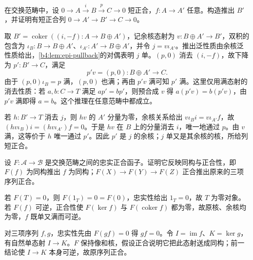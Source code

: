 \begin{exercise}\label{b4:ex:04-pushout-extension}
	在交换范畴中，设 \(0\to A\xrightarrow iB\xrightarrow pC\to0\) 短正合，\(f:A\to A'\) 任意。构造推出 \(B'\)，并证明有短正合列 \(0\to A'\to B'\to C\to0\)。
\end{exercise}
\begin{solution}
	取 \(B'=\operatorname{coker}((i,-f):A\to B\oplus A')\)，记余核态射为 \(v:B\oplus A'\to B'\)，双积的包含为 \(\iota_B:B\to B\oplus A'\)、\(\iota_{A'}:A'\to B\oplus A'\)，并令 \(j=v\iota_{A'}\)。推出泛性质由余核泛性质给出，\cref{b4:lem:epi-pullback}的对偶表明 \(j\) 单。\((p,0)\) 消去 \((i,-f)\)，故下降为 \(p':B'\to C\)，满足
	\[
		p'v=(p,0):B\oplus A'\longrightarrow C.
	\]
	由于 \((p,0)\iota_B=p\) 满，\((p,0)\) 也满；再由 \(p'v\) 满可知 \(p'\) 满。这里仅用满态射的消去性质：若 \(a,b:C\to T\) 满足 \(ap'=bp'\)，则预合成 \(v\) 得 \(a(p'v)=b(p'v)\)，由 \(p'v\) 满即得 \(a=b\)。这个推理在任意范畴中都成立。

	若 \(h:B'\to T\) 消去 \(j\)，则 \(hv\) 的 \(A'\) 分量为零，余核关系给出 \(v\iota_Bi=v\iota_{A'}f\)，故 \((hv\iota_B)i=(hv\iota_{A'})f=0\)。于是 \(hv\) 在 \(B\) 上的分量消去 \(i\)，唯一地通过 \(p\)。由 \(v\) 满，这等价于 \(h\) 唯一通过 \(p'\)。因此 \(p'\) 是 \(j\) 的余核；\(j\) 单又是其余核的核，所给列短正合。
\end{solution}

\begin{exercise}\label{b4:ex:04-faithful-exact-reflects}
	设 \(F:\mathcal A\to\mathcal B\) 是交换范畴之间的忠实正合函子。证明它反映同构与正合性，即 \(F(f)\) 为同构推出 \(f\) 为同构；\(F(X)\to F(Y)\to F(Z)\) 正合推出原来的三项序列正合。
\end{exercise}
\begin{solution}
	若 \(F(T)=0\)，则 \(F(1_T)=0=F(0)\)，忠实性给出 \(1_T=0\)，故 \(T\) 为零对象。若 \(F(f)\) 可逆，正合性使 \(F(\ker f)\) 与 \(F(\operatorname{coker}f)\) 都为零，故原核、余核均为零，\(f\) 既单又满而可逆。

	对三项序列 \(f,g\)，忠实性先由 \(F(gf)=0\) 得 \(gf=0\)。令 \(I=\operatorname{im}f\)、\(K=\ker g\)，有自然单态射 \(I\to K\)。\(F\) 保持像和核，假设正合说明它把此态射送成同构；前一结论使 \(I\to K\) 本身可逆，故原序列正合。
\end{solution}
